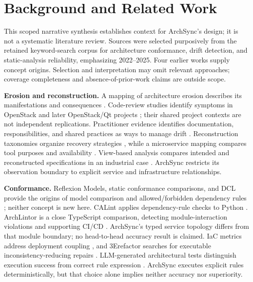 \section{Background and Related Work}
This scoped narrative synthesis establishes context for ArchSync's design; it is not a systematic literature review. Sources were selected purposively from the retained keyword-search corpus for architecture conformance, drift detection, and static-analysis reliability, emphasizing 2022--2025. Four earlier works supply concept origins. Selection and interpretation may omit relevant approaches; coverage completeness and absence-of-prior-work claims are outside scope.

\textbf{Erosion and reconstruction.} A mapping of architecture erosion describes its manifestations and consequences \cite{li2022erosion}. Code-review studies identify symptoms in OpenStack and later OpenStack/Qt projects \cite{li2022symptoms,li2023warnings}; their shared project contexts are not independent replications. Practitioner evidence identifies documentation, responsibilities, and shared practices as ways to manage drift \cite{anthony2024drifting}. Reconstruction taxonomies organize recovery strategies \cite{ducasse2009reconstruction,sar2024taxonomy}, while a microservice mapping compares tool purposes and availability \cite{bakhtin2024mapping}. View-based analysis compares intended and reconstructed specifications in an industrial case \cite{uzun2024drift}. ArchSync restricts its observation boundary to explicit service and infrastructure relationships.

\textbf{Conformance.} Reflexion Models, static conformance comparisons, and DCL provide the origins of model comparison and allowed/forbidden dependency rules \cite{murphy1995reflexion,knodel2007comparison,terra2009dcl}; neither concept is new here. CALint applies dependency-rule checks to Python \cite{calint2022}. ArchLintor is a close TypeScript comparison, detecting module-interaction violations and supporting CI/CD \cite{archlintor2025}. ArchSync's typed service topology differs from that module boundary; no head-to-head accuracy result is claimed. IaC metrics address deployment coupling \cite{ntentos2022iac}, and 3Erefactor searches for executable inconsistency-reducing repairs \cite{refactor2024}. LLM-generated architectural tests distinguish execution success from correct rule expression \cite{lucena2025gatekeepers}. ArchSync executes explicit rules deterministically, but that choice alone implies neither accuracy nor superiority.

